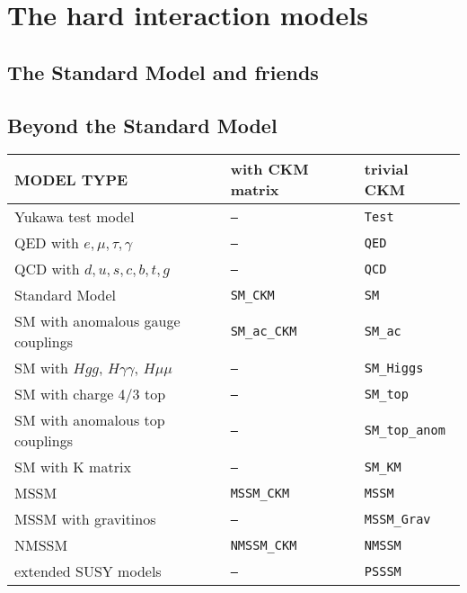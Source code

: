 \documentclass[12pt]{book}
\begin{document}

\section{The hard interaction models}

\subsection{The Standard Model and friends}


\subsection{Beyond the Standard Model}

\begin{table}
        \begin{center}
           \begin{tabular}{|l|l|l|}
             \hline
             MODEL TYPE & with CKM matrix & trivial CKM \\
             \hline\hline
             Yukawa test model & \tt{---} & \tt{Test} \\
             \hline
             QED with $e,\mu,\tau,\gamma$ & \tt{---} &  \tt{QED} \\
             QCD with $d,u,s,c,b,t,g$ & \tt{---} &  \tt{QCD} \\
             Standard Model        & \tt{SM\_CKM} & \tt{SM} \\
             SM with anomalous gauge couplings &  \tt{SM\_ac\_CKM} &
             \tt{SM\_ac} \\
             SM with $Hgg$, $H\gamma\gamma$, $H\mu\mu$ &  \tt{---} &
             \tt{SM\_Higgs} \\
             SM with charge 4/3 top &  \tt{---} &
             \tt{SM\_top} \\
             SM with anomalous top couplings &  \tt{---} &
             \tt{SM\_top\_anom} \\
             SM with K matrix &  \tt{---} &
             \tt{SM\_KM} \\\hline
             MSSM &   \tt{MSSM\_CKM} & \tt{MSSM} \\
             \hline
             MSSM with gravitinos &   \tt{---} & \tt{MSSM\_Grav} \\
             \hline
             NMSSM &   \tt{NMSSM\_CKM} & \tt{NMSSM} \\
             \hline
             extended SUSY models &   \tt{---} & \tt{PSSSM} \\

\end{tabular}
\end{center}
\end{table}
\end{document}
